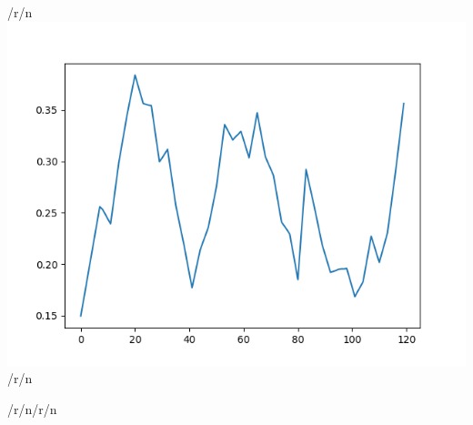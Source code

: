 \documentclass{article}
\begin{document}
\begin{multicols*}{2}
\begin{center}/r/n\includegraphics[width=\linewidth]{per_unit_wind_generation.png}/r/n\end{center}/r/n/r/n





\end{multicols*}
\end{document}
